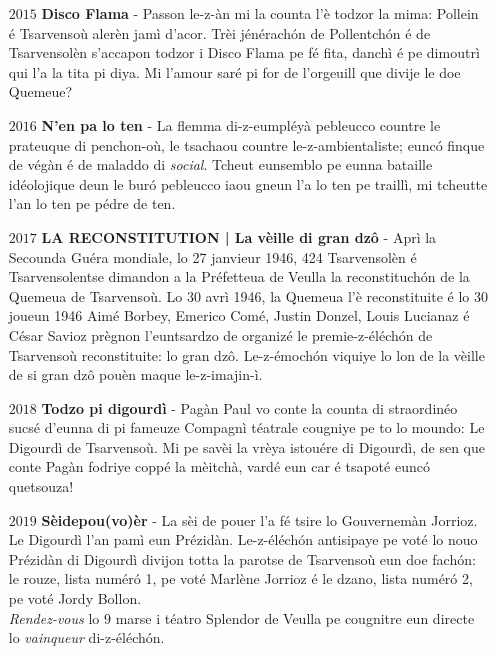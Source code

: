 \begin{itemize}
\item[$2015$] \textbf{Disco Flama} - Passon le-z-àn mi la counta l'è todzor la mima: Pollein é Tsarvensoù alerèn jamì d'acor. Trèi jénérach\'on de Pollentch\'on é de Tsarvensolèn s'accapon todzor i Disco Flama pe fé fita, danchì é pe dimoutrì qui l'a la tita pi diya. Mi l'amour saré pi for de l'orgeuill que divije le doe Quemeue? \newline

\item[$2016$] \textbf{N'en pa lo ten} - La flemma di-z-eumpléyà pebleucco countre le prateuque di penchon-où, le tsachaou countre le-z-am\-bien\-ta\-li\-ste; eunc\'o finque de végàn é de maladdo di \textit{social}. Tcheut eunsemblo pe eunna bataille idéolojique deun le bur\'o pebleucco iaou gneun l'a lo ten pe traillì, mi tcheutte l'an lo ten pe pédre de ten.\newline

\item[$2017$] \textbf{LA RECONSTITUTION | La vèille di gran dz\^{o}} - Aprì la Secounda Guéra mondiale, lo 27 janvieur 1946, 424 Tsarvensolèn é Tsarvensolentse dimandon a la Préfetteua de Veulla la reconstituch\'on de la Quemeua de Tsarvensoù. Lo 30 avrì 1946, la Quemeua l'è reconstituite é lo 30 joueun 1946 Aimé Borbey, Emerico Comé, Justin Donzel, Louis Lucianaz é César Savioz prègnon l'euntsardzo de organizé le premie-z-éléch\'on de Tsarvensoù reconstituite: lo gran dzô. Le-z-é\-mo\-ch\'on viquiye lo lon de la vèille de si gran dzô pouèn maque le-z-imajin-ì.\newline

\item[$2018$] \textbf{Todzo pi digourdì} - Pagàn Paul vo conte la counta di straordinéo sucsé d'eunna di pi fameuze Compagnì téatrale cougniye pe to lo moundo: Le Digourdì de Tsarvensoù. Mi pe savèi la vrèya istouére di Digourdì, de sen que conte Pagàn fodriye coppé la mèitchà, vardé eun car é tsapoté eunc\'o quetsouza!\newline

\item[$2019$] \textbf{Sèidepou(vo)èr} - La sèi de pouer l'a fé tsire lo Gouvernemàn Jorrioz. Le Digourdì l'an pamì eun Prézidàn. Le-z-éléch\'on antisipaye pe voté lo nouo Prézidàn di Digourdì divijon totta la parotse de Tsarvensoù eun doe fach\'on: le rouze, lista numér\'o 1, pe voté Marlène Jorrioz é le dzano, lista numér\'o 2, pe voté Jordy Bollon. \\\textit{Rendez-vous} lo 9 marse i téatro Splendor de Veulla pe cougnitre eun directe lo \textit{vainqueur} di-z-éléch\'on.

\end{itemize}